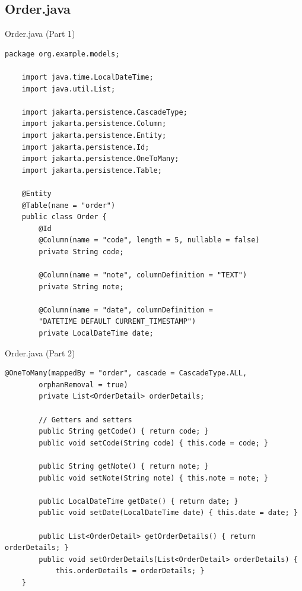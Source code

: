 \documentclass[aspectratio=169, table]{beamer}
\begin{document}
\subsection{Order.java}
\begin{frame}[fragile]{Order.java (Part 1)}
\vspace{20pt}
\begin{lstlisting}[style=JavaStyle]
	package org.example.models;
	
	import java.time.LocalDateTime;
	import java.util.List;
	
	import jakarta.persistence.CascadeType;
	import jakarta.persistence.Column;
	import jakarta.persistence.Entity;
	import jakarta.persistence.Id;
	import jakarta.persistence.OneToMany;
	import jakarta.persistence.Table;
	
	@Entity
	@Table(name = "order")
	public class Order {
		@Id
		@Column(name = "code", length = 5, nullable = false)
		private String code;
		
		@Column(name = "note", columnDefinition = "TEXT")
		private String note;
		
		@Column(name = "date", columnDefinition = 
		"DATETIME DEFAULT CURRENT_TIMESTAMP")
		private LocalDateTime date;
	\end{lstlisting}
\end{frame}

\begin{frame}[fragile]{Order.java (Part 2)}
	\vspace{20pt}
	\begin{lstlisting}[style=JavaStyle]
		@OneToMany(mappedBy = "order", cascade = CascadeType.ALL, 
		orphanRemoval = true)
		private List<OrderDetail> orderDetails;
		
		// Getters and setters
		public String getCode() { return code; }
		public void setCode(String code) { this.code = code; }
		
		public String getNote() { return note; }
		public void setNote(String note) { this.note = note; }
		
		public LocalDateTime getDate() { return date; }
		public void setDate(LocalDateTime date) { this.date = date; }
		
		public List<OrderDetail> getOrderDetails() { return orderDetails; }
		public void setOrderDetails(List<OrderDetail> orderDetails) { 
			this.orderDetails = orderDetails; }
	}
\end{lstlisting}
\end{frame}
\end{document}
